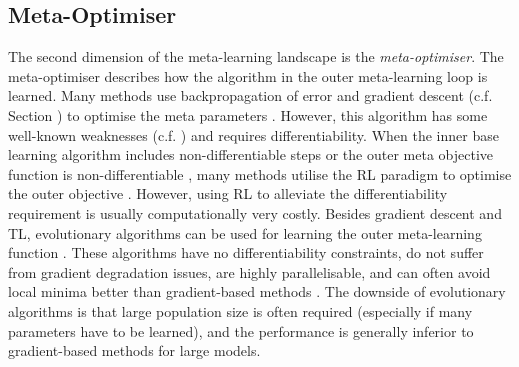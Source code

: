 \subsection{Meta-Optimiser}
The second dimension of the meta-learning landscape is the \emph{meta-optimiser}.
The meta-optimiser describes how the algorithm in the outer meta-learning loop is learned.
Many methods use backpropagation of error and gradient descent (c.f. Section ) to optimise the meta parameters \cite{ravi2017optimization, 10-5555-3305381-3305498, li2019feature, 10-5555-3305381-3305502, pmlr-v80-franceschi18a, Micaelli_Storkey_2021, pmlr-v108-lorraine20a}.
However, this algorithm has some well-known weaknesses (c.f. ) and requires differentiability.
When the inner base learning algorithm includes non-differentiable steps  or the outer meta objective function is non-differentiable , many methods utilise the RL paradigm to optimise the outer objective .
However, using RL to alleviate the differentiability requirement is usually computationally very costly.
Besides gradient descent and TL, evolutionary algorithms can be used for learning the outer meta-learning function \cite{schmidhuber-1987, Stanley_Clune_Lehman_Miikkulainen_2019, Salimans_Ho_Chen_Sidor_Sutskever_2017}.
These algorithms have no differentiability constraints, do not suffer from gradient degradation issues, are highly parallelisable, and can often avoid local minima better than gradient-based methods .
The downside of evolutionary algorithms is that large population size is often required (especially if many parameters have to be learned), and the performance is generally inferior to gradient-based methods for large models.

